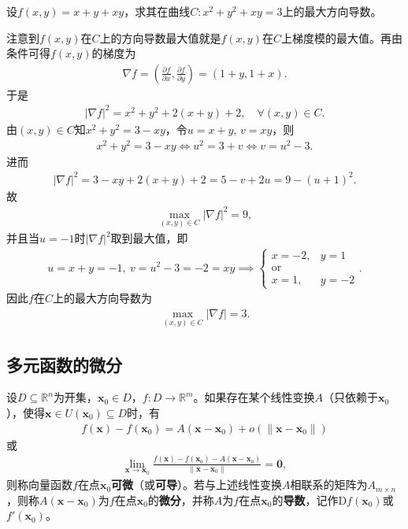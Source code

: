 \documentclass[../../main.tex]{subfiles}%
\begin{document}
\begin{example}
设$f(x,y) = x + y + xy$，求其在曲线$C: x^2 + y^2 + xy = 3$上的最大方向导数。
\end{example}
\begin{solution}
注意到$f(x,y)$在$C$上的方向导数最大值就是$f(x,y)$在$C$上梯度模的最大值。再由条件可得$f(x,y)$的梯度为
\begin{align*}
\nabla f = \left( \frac{\partial f}{\partial x}, \frac{\partial f}{\partial y} \right) = (1+y, 1+x).
\end{align*}
于是
\begin{align*}
|\nabla f|^2 = x^2 + y^2 + 2(x+y) + 2, \quad \forall (x,y) \in C.
\end{align*}
由$(x,y) \in C$知$x^2 + y^2 = 3 - xy$，令$u = x + y$, $v = xy$，则
\begin{align*}
x^2 + y^2 = 3 - xy \iff u^2 = 3 + v \iff v = u^2 - 3.
\end{align*}
进而
\begin{align*}
|\nabla f|^2 = 3 - xy + 2(x+y) + 2 = 5 - v + 2u = 9 - (u+1)^2.
\end{align*}
故
\begin{align*}
\max\limits_{(x,y) \in C} |\nabla f|^2 = 9,
\end{align*}
并且当$u = -1$时$|\nabla f|^2$取到最大值，即
\begin{align*}
u = x + y = -1,\ v = u^2 - 3 = -2 = xy \implies
\begin{cases}
x = -2, & y = 1 \\
\text{or} \\
x = 1, & y = -2
\end{cases}.
\end{align*}
因此$f$在$C$上的最大方向导数为
\begin{align*}
\max\limits_{(x,y) \in C} |\nabla f| = 3.
\end{align*}

\end{solution}


\subsection{多元函数的微分}

\begin{definition}
设$D \subseteq \mathbb{R}^n$为开集，$\bm{x}_0 \in D$，$f: D \to \mathbb{R}^m$。如果存在某个线性变换$A$（只依赖于$\bm{x}_0$），使得$\bm{x} \in U(\bm{x}_0) \subseteq D$时，有
\begin{align*}
f(\bm{x}) - f(\bm{x}_0) = A(\bm{x} - \bm{x}_0) + o\left( \|\bm{x} - \bm{x}_0\| \right)
\end{align*}
或
\begin{align*}
\lim\limits_{\bm{x} \to \bm{x}_0} \frac{f(\bm{x}) - f(\bm{x}_0) - A(\bm{x} - \bm{x}_0)}{\|\bm{x} - \bm{x}_0\|} = \bm{0},
\end{align*}
则称向量函数$f$在点$\bm{x}_0$\textbf{可微}（或\textbf{可导}）。若与上述线性变换$A$相联系的矩阵为$A_{m \times n}$，则称$A(\bm{x} - \bm{x}_0)$为$f$在点$\bm{x}_0$的\textbf{微分}，并称$A$为$f$在点$\bm{x}_0$的\textbf{导数}，记作$\mathrm{D}f(\bm{x}_0)$或$f'(\bm{x}_0)$。
\end{definition}
\end{document}
